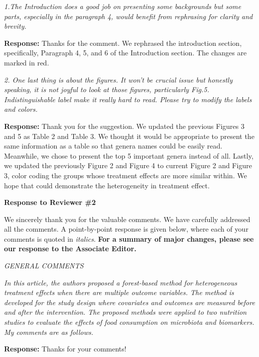 \documentclass[11pt]{article}
\begin{document}
{\em 1.The Introduction does a good job on presenting some backgrounds but some parts, especially in the paragraph 4, would benefit from rephrasing for clarity and brevity.}

\medskip

\textbf{Response:} Thanks for the comment. We rephrased the introduction section, specifically, Paragraph 4, 5, and 6 of the Introduction section. The changes are marked in red. 

\bigskip

{\em 2. One last thing is about the figures. It won't be crucial issue but honestly speaking, it is not joyful to look at those figures, particularly Fig.5. Indistinguishable label make it really hard to read. Please try to modify the labels and colors.}

\medskip

\textbf{Response:} Thank you for the suggestion. We updated the previous Figures 3 and 5 as Table 2 and Table 3. We thought it would be appropriate to present the same information as a table so that genera names could be easily read. Meanwhile, we chose to present the top 5 important genera instead of all. Lastly, we updated the previously Figure 2 and Figure 4 to current Figure 2 and Figure 3, color coding the groups whose treatment effects are more similar within. We hope that could demonstrate the heterogeneity in treatment effect.

\newpage
{\bf Response to Reviewer \#2}

We sincerely thank you for the valuable comments. We have carefully addressed all the comments. A point-by-point response is given below, where each of your comments is quoted in {\em italics}. \textbf{For a summary of major changes, please see our response to the Associate Editor. }

\bigskip

{\em GENERAL COMMENTS}

{\em In this article, the authors proposed a forest-based method for heterogeneous treatment effects when there are multiple outcome variables. The method is developed for the study design where covariates and outcomes are measured before and after the intervention. The proposed methods were applied to two nutrition studies to evaluate the effects of food consumption on microbiota and biomarkers. My comments are as follows.}

\medskip

\textbf{Response:} Thanks for your comments!

\bigskip
\end{document}
